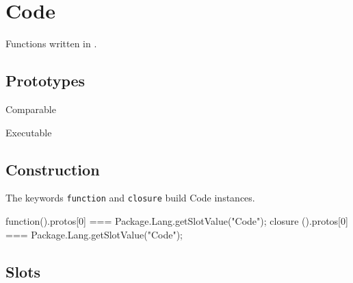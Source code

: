 
\section{Code}

Functions written in \us.

\subsection{Prototypes}

\begin{refObjects}
\item[Comparable]
\item[Executable]
\end{refObjects}

\subsection{Construction}

The keywords \lstinline|function| and \lstinline|closure| build Code
instances.

\begin{urbiassert}
function(){}.protos[0] === Package.Lang.getSlotValue("Code");
closure (){}.protos[0] === Package.Lang.getSlotValue("Code");
\end{urbiassert}

\subsection{Slots}

